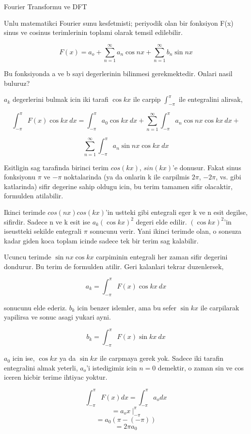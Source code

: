 \documentclass[12pt,fleqn]{article}\usepackage{../common}
\begin{document}
Fourier Transformu ve DFT

Unlu matematikci Fourier sunu kesfetmisti; periyodik olan bir fonksiyon F(x)
sinus ve cosinus terimlerinin toplami olarak temsil edilebilir.

\[ F(x) = a_o + \sum_{n=1}^{\infty}a_n \cos nx + \sum_{n=1}^{\infty}b_n \sin nx  \]

Bu fonksiyonda a ve b sayi degerlerinin bilinmesi gerekmektedir. Onlari nasil
buluruz? 

$a_k$ degerlerini bulmak icin iki tarafi $\cos kx$ ile carpip
$\int_{-\pi}^{\pi}$ ile entegralini alirsak,

\[ \int_{-\pi}^{\pi} F(x)\cos kx \ dx = \int_{-\pi}^{\pi} a_0 \cos
kx \ dx +  \sum_{n=1}^{\infty}\int_{-\pi}^{\pi} a_n \cos nx \cos kx \ dx +   \]

\[ \sum_{n=1}^{\infty}\int_{-\pi}^{\pi} a_n \sin nx \cos kx \ dx   \]

Esitligin sag tarafinda birinci terim $cos(kx)$, $sin(kx)$'e donusur. Fakat sinus
fonksiyonu $\pi$ ve $-\pi$ noktalarinda (ya da onlarin k ile carpilmis $2\pi$,
$-2\pi$, vs. gibi katlarinda) sifir degerine sahip oldugu icin, bu terim tamamen
sifir olacaktir, formulden atilabilir.

Ikinci terimde $cos(nx)cos(kx)$'in ustteki gibi entegrali eger k ve n esit
degilse, sifirdir. Sadece n ve k esit ise $a_k(\cos kx)^2$ degeri elde edilir.
$(\cos kx)^2$'in iseustteki sekilde entegrali $\pi$ sonucunu verir. Yani ikinci
terimde olan, o sonsuza kadar giden koca toplam icinde sadece tek bir terim sag
kalabilir.

Ucuncu terimde $\sin nx \cos kx$ carpiminin entegrali her zaman
sifir degerini dondurur. Bu terim de formulden atilir. Geri kalanlari tekrar
duzenlersek, 

\[ a_k = \int_{-\pi}^{\pi} F(x)\cos kx \ dx \]

sonucunu elde ederiz. $b_k$ icin benzer islemler, ama bu sefer $\sin kx$ ile carpilarak yapilirsa ve
sonuc asagi yukari ayni.

\[ b_k = \int_{-\pi}^{\pi} F(x)\sin kx \ dx \]

$a_0$ icin ise, $\cos kx$ ya da $\sin kx$ ile carpmaya gerek yok. Sadece iki
tarafin entegralini almak yeterli, $a_o$'i istedigimiz icin $n=0$ demektir, o
zaman sin ve cos iceren hicbir terime ihtiyac yoktur.

\[  \int_{-\pi}^{\pi} F(x) dx =  \int_{-\pi}^{\pi} a_o dx \]
\[  =  a_o x \ \bigg|_{-\pi}^{\pi}  \]
\[  = a_0 (\pi -(-\pi))  \]
\[  = 2\pi a_0  \]
\end{document}
